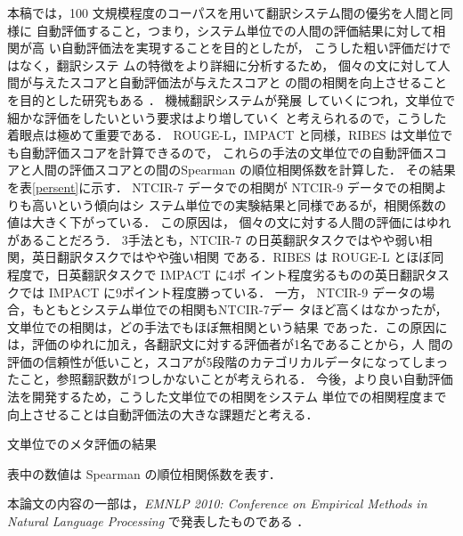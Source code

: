 \documentclass[japanese]{jnlp_1.4}
\begin{document}
本稿では，100 文規模程度のコーパスを用いて翻訳システム間の優劣を人間と同様に
自動評価すること，つまり，システム単位での人間の評価結果に対して相関が高
 い自動評価法を実現することを目的としたが，
こうした粗い評価だけではなく，翻訳システ
ムの特徴をより詳細に分析するため，
個々の文に対して人間が与えたスコアと自動評価法が与えたスコアと
の間の相関を向上させることを目的とした研究もある
\cite{Kulesza04,Gamon05,echizenya:ACL2010}．
機械翻訳システムが発展
していくにつれ，文単位で細かな評価をしたいという要求はより増していく
と考えられるので，こうした着眼点は極めて重要である．
ROUGE-L，IMPACT と同様，RIBES は文単位でも自動評価スコアを計算できるので，
これらの手法の文単位での自動評価スコアと人間の評価スコアとの間のSpearman
の順位相関係数を計算した．
その結果を表\ref{persent}に示す．
NTCIR-7 データでの相関が NTCIR-9 データでの相関よりも高いという傾向はシ
ステム単位での実験結果と同様であるが，相関係数の値は大きく下がっている．
この原因は，
個々の文に対する人間の評価にはゆれがあることだろう．
3手法とも，NTCIR-7 の日英翻訳タスクではやや弱い相関，英日翻訳タスクではやや強い相関
である．RIBES は ROUGE-L とほぼ同程度で，日英翻訳タスクで IMPACT に4ポ
イント程度劣るものの英日翻訳タスクでは IMPACT に9ポイント程度勝っている．
一方， NTCIR-9 データの場合，もともとシステム単位での相関もNTCIR-7デー
タほど高くはなかったが，文単位での相関は，どの手法でもほぼ無相関という結果
であった．この原因には，評価のゆれに加え，各翻訳文に対する評価者が1名であることから，人
間の評価の信頼性が低いこと，スコアが5段階のカテゴリカルデータになってしまっ
たこと，参照翻訳数が1つしかないことが考えられる．
今後，より良い自動評価法を開発するため，こうした文単位での相関をシステム
単位での相関程度まで向上させることは自動評価法の大きな課題だと考える．

\begin{table}[t]
  \caption{文単位でのメタ評価の結果}
  \label{persent}

\small
表中の数値は Spearman の順位相関係数を表す．
\par
\end{table}


\acknowledgment

本論文の内容の一部は，\textit{EMNLP 2010: Conference on Empirical Methods in Natural Language
Processing} で発表したものである \cite{isozaki:emnlp2010} ．
\end{document}
